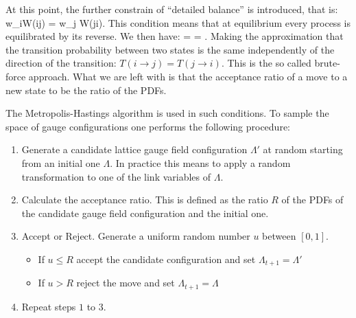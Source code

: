 \eeq 
At this point, the further constrain of ``detailed balance'' \cite{robert_monte_2004} is introduced, that is:
\beq
    w_iW(i\rightarrow j) =  w_j W(j\rightarrow i).
\eeq 
This condition means that at equilibrium every process is equilibrated by its reverse. We then have:
\beq
     =  = .
\eeq
Making the approximation that the transition probability between two states is the same independently of the direction of the transition: $T(i\rightarrow j) = T(j\rightarrow i)$. This is the so called brute-force approach. What we are left with is that the acceptance ratio of a move to a new state to be the ratio of the PDFs.  

The Metropolis-Hastings algorithm is used in such conditions. To sample the space of gauge configurations one performs the following procedure:
\begin{enumerate}
    \item Generate a candidate lattice gauge field configuration $\Lambda'$ at random starting from an initial one $\Lambda$. In practice this means to apply a random transformation to one of the link variables of $\Lambda$.
    \item Calculate the acceptance ratio. This is defined as the ratio $R$ of the PDFs of the candidate gauge field configuration and the initial one.
    \item Accept or Reject. Generate a uniform random number $u$ between $[0,1]$. 
    \begin{itemize}
        \item If $u \leq R$ accept the candidate configuration and set $\Lambda_{t+1} = \Lambda'$
        \item If $u > R$ reject the move and set $\Lambda_{t+1} = \Lambda$
    \end{itemize}
    \item Repeat steps $1$ to $3$.
\end{enumerate}

